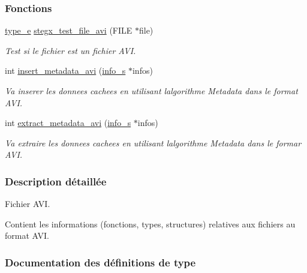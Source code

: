 \subsubsection*{Fonctions}
\begin{DoxyCompactItemize}
\item 
\hyperlink{a00047_af1ca434cca36ba9fb2a45f6cef3a16d6}{type\+\_\+e} \hyperlink{a00071_a219859c3514ef04eb40cb27845b208b0}{stegx\+\_\+test\+\_\+file\+\_\+avi} (F\+I\+LE $\ast$file)
\begin{DoxyCompactList}\small\item\em Test si le fichier est un fichier A\+VI. \end{DoxyCompactList}\item 
int \hyperlink{a00071_ac4b663dd386f05a601c55cd34b99cca4}{insert\+\_\+metadata\+\_\+avi} (\hyperlink{a00008_aa8ca908d92fb5bdd3c0a9e1f58b2cf03}{info\+\_\+s} $\ast$infos)
\begin{DoxyCompactList}\small\item\em Va inserer les donnees cachees en utilisant l\textquotesingle{}algorithme Metadata dans le format A\+VI. \end{DoxyCompactList}\item 
int \hyperlink{a00071_aa0a2b469d42533228d073a79868e775b}{extract\+\_\+metadata\+\_\+avi} (\hyperlink{a00008_aa8ca908d92fb5bdd3c0a9e1f58b2cf03}{info\+\_\+s} $\ast$infos)
\begin{DoxyCompactList}\small\item\em Va extraire les donnees cachees en utilisant l\textquotesingle{}algorithme Metadata dans le formar A\+VI. \end{DoxyCompactList}\end{DoxyCompactItemize}


\subsubsection{Description détaillée}
Fichier A\+VI. 

Contient les informations (fonctions, types, structures) relatives aux fichiers au format A\+VI. 

\subsubsection{Documentation des définitions de type}
\mbox{\label{a00071_a1c6fab5211eb03b7a7a0243c341b7882}} 
